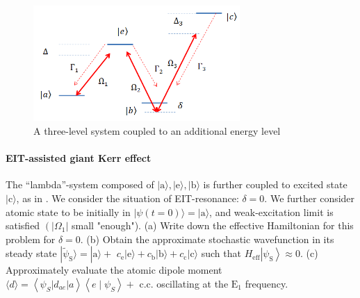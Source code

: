\documentclass[hyperref, a4paper]{article}
\begin{document}
\paragraph{}

\begin{figure}
    \centering
    \includegraphics[width=0.7\textwidth]{fig3.png}
    \caption{A three-level system coupled to an additional energy level}
    \label{fig:sys-3}
\end{figure}

\paragraph{EIT-assisted giant Kerr effect} The ``lambda''-system composed of $|\text{a}\rangle,|\text{e}\rangle,|\text{b}\rangle$ is further coupled to excited state $|\text{c}\rangle$, as in . We consider the situation of EIT-resonance: $\delta=0$. We further consider atomic state to be initially in $|\psi(t=0)\rangle=|\mathrm{a}\rangle$, and weak-excitation limit is satisfied $\left(\left|\Omega_{1}\right|\right.$ small "enough").
(a) Write down the effective Hamiltonian for this problem for $\delta=0$.
(b) Obtain the approximate stochastic wavefunction in its steady state $|\tilde{\psi}_\text{S}\rangle=|\text{a}\rangle+$ ${c}_{\mathrm{e}}|\text{e}\rangle+c_\text{b}|\text{b}\rangle+c_\text{c}|\text{c}\rangle$ such that ${H}_{\mathrm{eff}}\left|\psi_{\mathrm{S}}\right\rangle \approx 0$.
(c) Approximately evaluate the atomic dipole moment $\langle {d}\rangle=\left\langle\psi_{S}\left|d_{a e}\right| a\right\rangle\left\langle e \mid \psi_{S}\right\rangle+$ c.c. oscillating at the $\mathrm{E}_{1}$ frequency.
\end{document}
